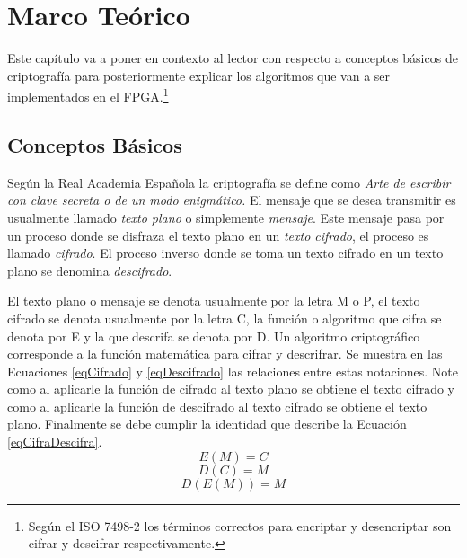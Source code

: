\chapter{Marco Teórico}

Este capítulo va a poner en contexto al lector con respecto a conceptos básicos de criptografía para posteriormente explicar los algoritmos que van a ser implementados en el FPGA.\footnote{Según el ISO 7498-2 los términos correctos para encriptar y desencriptar son cifrar y descifrar respectivamente.}

\section{Conceptos Básicos}
Según la Real Academia Española \cite{bruce} la criptografía se define como 
\newline
\newline
\emph{Arte de escribir con clave secreta o de un modo enigmático.}
\newline
\newline
El mensaje que se desea transmitir es usualmente llamado \textit{texto plano} o simplemente \textit{mensaje}. Este mensaje pasa por un proceso donde se disfraza el texto plano en un \textit{texto cifrado}, el proceso es llamado \textit{cifrado}. El proceso inverso donde se toma un texto cifrado en un texto plano se denomina \textit{descifrado}. 

El texto plano o mensaje se denota usualmente por la letra M o P, el texto cifrado se denota usualmente por la letra C, la función o algoritmo que cifra se denota por E y la que descrifa se denota por D. Un algoritmo criptográfico corresponde a la función matemática para cifrar y descrifrar.
\newline
Se muestra en las Ecuaciones \eqref{eqCifrado} y \eqref{eqDescifrado} las relaciones entre estas notaciones. Note como al aplicarle la función de cifrado al texto plano se obtiene el texto cifrado y como al aplicarle la función de descifrado al texto cifrado se obtiene el texto plano. Finalmente se debe cumplir la identidad que describe la Ecuación \eqref{eqCifraDescifra}. \cite{bruce}
\begin{equation} \label{eqCifrado}
E(M) = C
\end{equation}
\begin{equation} \label{eqDescifrado}
D(C) = M
\end{equation}
\begin{equation} \label{eqCifraDescifra}
D(E(M)) = M
\end{equation}


